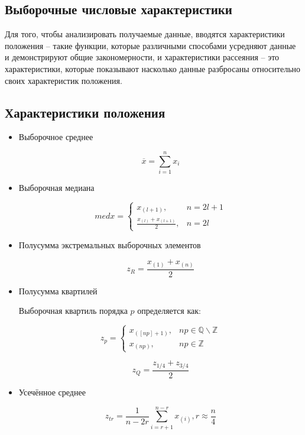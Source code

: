 \subsection{Выборочные числовые характеристики}
Для того, чтобы анализировать получаемые данные, вводятся характеристики положения -- такие функции, которые различными способами усредняют данные и демонстрируют общие закономерности, и характеристики рассеяния -- это характеристики, которые показывают насколько данные разбросаны относительно своих характеристик положения.

\subsection{Характеристики положения}
\begin{itemize}
	\item Выборочное среднее
	
	\begin{equation}\label{mean}
		\overline{x}=\displaystyle \sum_{i=1}^{n} {x_i}
	\end{equation}
	
	\item Выборочная медиана
	
	\begin{equation}\label{med}
		med x =
		\begin{cases}
		x_{(l+1)}, & n=2l + 1 \\
		\frac{x_{(l)}+x_{(l+1)}}{2}, & n=2l
		\end{cases}
	\end{equation}

	\item Полусумма экстремальных выборочных элементов

	\begin{equation}\label{zr}	
		z_R =\frac{x_{(1)}+x_{(n)}}{2}
	\end{equation}
	
	\item Полусумма квартилей
	
	Выборочная квартиль порядка $p$ определяется как:
	
	$$z_p =
	\begin{cases}
	x_{([np]+1)}, & np \in \mathbb{Q} \backslash \mathbb{Z} \\
	x_{(np)}, & np \in \mathbb{Z}
	\end{cases}
	$$
	
	\begin{equation}\label{zq}
		z_Q =\frac{z_{1/4}+z_{3/4}}{2}
	\end{equation}
	
	\item Усечённое среднее
	
	\begin{equation}\label{tr_mean}
		z_{tr}=\frac{1}{n-2r}\displaystyle \sum_{i=r+1}^{n-r} x_{(i)}, r \approx \frac{n}{4}
	\end{equation}
\end{itemize}

